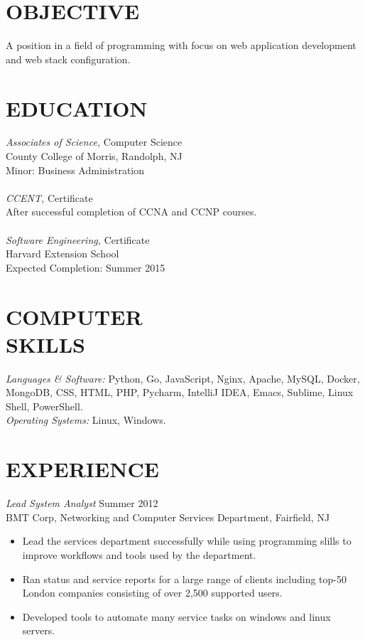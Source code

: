 \documentclass[line,margin]{res}
\begin{document}
\address{265  Main Road, Montville, NJ 07045}
\address{862-345-8316}

 
\begin{resume}
 
\section{OBJECTIVE}	A position in a field of programming with focus 
	on web application development and web stack configuration.
 
\section{EDUCATION} {\sl Associates of Science,} Computer Science \\
		County College of Morris, Randolph, NJ  \\
	 	Minor: Business Administration \\ \\
	{\sl CCENT,} Certificate \\
		After successful completion of CCNA and CCNP courses. \\ \\
	{\sl Software Engineering,} Certificate \\
		Harvard Extension School \\
		Expected Completion: Summer 2015

\section{COMPUTER \\ SKILLS} {\sl Languages \& Software:} Python, Go, JavaScript, 
	Nginx, Apache, MySQL, Docker, MongoDB, CSS, HTML, PHP,
	Pycharm, IntelliJ IDEA, Emacs, Sublime, Linux Shell, PowerShell. \\
	{\sl Operating Systems:} Linux, Windows.

\section{EXPERIENCE} {\sl Lead System Analyst} \hfill Summer 2012 \\
	BMT Corp, Networking and Computer Services Department, Fairfield, NJ
	\begin{itemize}  \itemsep -2pt
		\item Lead the services department successfully while using programming slills to improve
			workflows and tools used by the department. 
		\item Ran status and service reports for a large range of clients including top-50
			London companies consisting of over 2,500 supported users.
		\item   Developed tools to automate many service tasks on windows and linux servers.
	\end{itemize}


\end{resume}
\end{document}
